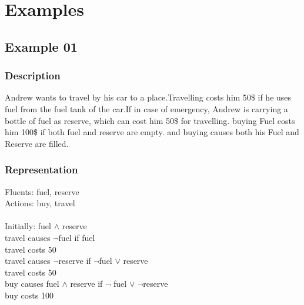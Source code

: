 \documentclass[11pt]{article}
\begin{document}
	\section{Examples}\label{sec:Examples}
	\subsection{Example 01}\label{example:ex01}
	\subsubsection{Description}\label{par:p101}
	Andrew wants to travel by his car to a place.Travelling costs him 50\$ if he uses fuel from the fuel tank of the car.If in case of emergency, Andrew is carrying a bottle of fuel as reserve, which can cost him 50\$ for travelling. buying Fuel costs him 100\$ if both fuel and reserve are empty. and buying causes both his Fuel and Reserve are filled. 
	\subsubsection{Representation}\label{par:p201}
	Fluents: fuel, reserve\\
	Actions: buy, travel\\
	\\
	Initially:  fuel $\wedge$ reserve \\
	travel causes $\neg$fuel if fuel \\
	travel costs 50 \\
	travel causes $\neg$reserve if $\neg$fuel $\vee$ reserve\\
	travel costs 50 \\
	buy causes fuel $\wedge$ reserve  if $\neg$ fuel $\vee$ $\neg$reserve\\
	buy costs 100 \\
\end{document}
